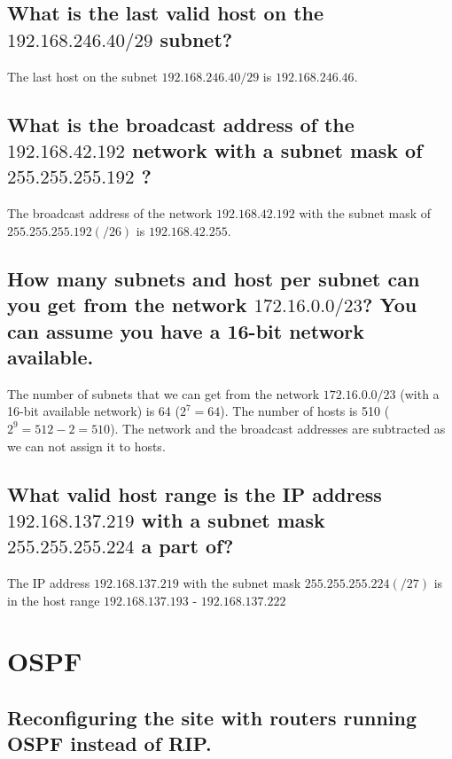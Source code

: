 \documentclass{article}
\begin{document}
\subsection{What is the last valid host on the $192.168.246.40/29$ subnet?}
The last host on the subnet $192.168.246.40/29$ is $192.168.246.46$.

\subsection{What is the broadcast address of the $192.168.42.192$ network with a subnet mask of 
$255.255.255.192$ ?}

The broadcast address of the network $192.168.42.192$ with the subnet mask of $255.255.255.192 (/26)$ is $192.168.42.255$.

\subsection{How many subnets and host per subnet can you get from the network $172.16.0.0/23$? You 
can assume you have a 16-bit network available.}

The number of subnets that we can get from the network $172.16.0.0/23$ (with a 16-bit available network)  is 64 ($2^7 = 64$). The number of hosts is 510 ($ 2^9 = 512 -2 = 510$). The network and the broadcast addresses are subtracted as we can not assign it to hosts.
 
\subsection{What valid host range is the IP address $192.168.137.219$ with a subnet mask $255.255.255.224$ a part of?}

The IP address $192.168.137.219$ with the subnet mask $255.255.255.224 (/27)$ is in the host range 
$192.168.137.193$ - $192.168.137.222$

\section{OSPF}

\subsection{Reconfiguring the site with routers running OSPF instead of RIP.}
\end{document}
